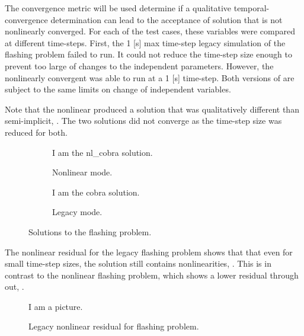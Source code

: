 
The convergence metric will be used determine if a qualitative temporal-convergence determination can lead to the acceptance of solution that is not nonlinearly converged.
For each of the test cases, these variables were compared at different time-steps.
First, the 1 [s] max time-step legacy simulation of the flashing problem failed to run.
It could not reduce the time-step size enough to prevent too large of changes to the independent parameters.
However, the nonlinearly convergent \cobra{} was able to run at a 1 [s] time-step.
Both versions of \cobra{} are subject to the same limits on change of independent variables.

Note that the nonlinear \cobra produced a solution that was qualitatively different than semi-implicit, .
The two solutions did not converge as the time-step size was reduced for both.

\begin{figure}
        \centering
        \begin{subfigure}[b]{0.48\textwidth}
                \centering
				I am the nl\_cobra solution.
                \caption{Nonlinear mode.}
                \label{fig:gull}
        \end{subfigure}%
        \begin{subfigure}[b]{0.48\textwidth}
                \centering
				I am the cobra solution.
                \caption{Legacy mode.}
                \label{fig:tiger}
        \end{subfigure}
        \caption{Solutions to the flashing problem.}
        \label{fig:flashing_solution}
\end{figure}

The nonlinear residual for the legacy flashing problem shows that that even for small time-step sizes, the solution still contains nonlinearities, .
This is in contrast to the nonlinear flashing problem, which shows a lower residual through out, .

\begin{figure}[h!t]
\begin{center}
I am a picture.
\end{center}
\caption{Legacy \cobra{} nonlinear residual for flashing problem.}
\label{fig:legacy_flashing_residual}
\end{figure}

